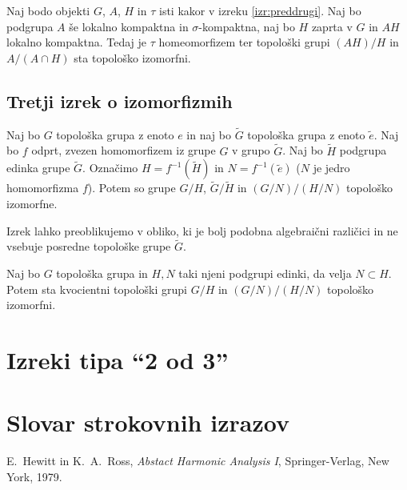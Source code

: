\documentclass[mat1]{fmfdelo}
\begin{document}
\begin{izrek}\label{izr:drugitopizrek}
Naj bodo objekti $G$, $A$, $H$ in $\tau$ isti kakor v izreku \ref{izr:preddrugi}. Naj bo podgrupa $A$ še lokalno kompaktna in $\sigma$-kompaktna, naj bo $H$ zaprta v $G$ in $AH$ lokalno kompaktna. Tedaj je $\tau$ homeomorfizem ter topološki grupi $(AH)/H$ in $A/(A \cap H)$ sta topološko izomorfni.
\end{izrek}


\subsection{Tretji izrek o izomorfizmih}
\begin{izrek}\label{izr:predtretji}
Naj bo $G$ topološka grupa z enoto $e$ in naj bo $\widetilde{G}$ topološka grupa z enoto $\tilde{e}$. Naj bo $f$ odprt, zvezen homomorfizem iz grupe $G$ v grupo $\widetilde{G}$. Naj bo $\widetilde{H}$ podgrupa edinka grupe $\widetilde{G}$. Označimo $H = f^{-1}(\widetilde{H})$ in $N = f^{-1}(\tilde{e})$ ($N$ je jedro homomorfizma $f$). Potem so grupe $G/H$, $\widetilde{G}/\widetilde{H}$ in $(G/N)/(H/N)$ topološko izomorfne.
\end{izrek}

Izrek lahko preoblikujemo v obliko, ki je bolj podobna algebraični različici in ne vsebuje posredne topološke grupe $\widetilde{G}$.
\begin{izrek}\label{izr:tretjitopizrek}
Naj bo $G$ topološka grupa in $H,N$ taki njeni podgrupi edinki, da velja $N \subset H$. Potem sta kvocientni topološki grupi $G/H$ in $(G/N)/(H/N)$ topološko izomorfni.
\end{izrek}

\section{Izreki tipa ``2 od 3''}



\section*{Slovar strokovnih izrazov}

\geslo{}{}
\geslo{}{}

\begin{thebibliography}{99}

E.~Hewitt in K.~A.~Ross, \emph{Abstact Harmonic Analysis I}, Springer-Verlag, New York, 1979.

\end{thebibliography}
\end{document}
